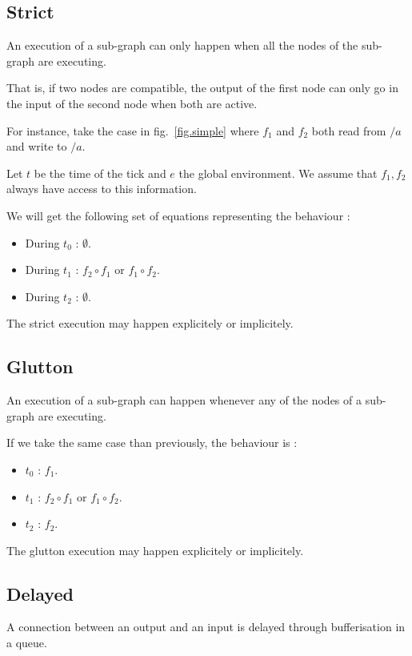 \documentclass{article}
\begin{document}
    \subsection{Strict}
    An execution of a sub-graph can only happen when all the nodes of the sub-graph are executing.
    
    That is, if two nodes are compatible, the output of the first node can only go in the input of the second node when both are active.
    
    For instance, take the case in fig.~\ref{fig.simple} where $f_1$ and $f_2$ both read from $/a$ and write to $/a$.
    
    Let $t$ be the time of the tick and $e$ the global environment. We assume that $f_1, f_2$ always have access to this information.
    
    We will get the following set of equations representing the behaviour : 
    \begin{itemize}
        \item During $t_0$ : $\emptyset$.
        \item During $t_1$ : $f_2 \circ f_1 $ or $f_1 \circ f_2$.
        \item During $t_2$ : $\emptyset$. 
    \end{itemize}

    The strict execution may happen explicitely or implicitely.
    
	\subsection{Glutton}
	An execution of a sub-graph can happen whenever any of the nodes of a sub-graph are executing. 
    
    If we take the same case than previously, the behaviour is :
    \begin{itemize}
        \item $t_0$ : $f_1$.
        \item $t_1$ : $f_2 \circ f_1$ or $f_1 \circ f_2$.
        \item $t_2$ : $f_2$. 
    \end{itemize}

    The glutton execution may happen explicitely or implicitely.
    
	\subsection{Delayed}
	A connection between an output and an input is delayed through bufferisation in a queue.
	
\end{document}
